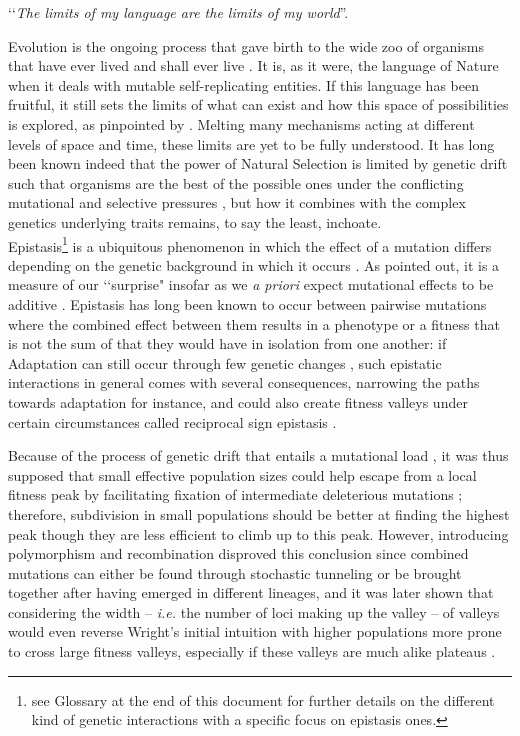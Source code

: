 \documentclass[11pt,onecolumn]{article}
\begin{document}
‘‘\textit{The limits of my language are the limits of my world}''.

\citep{Wittgenstein22}

Evolution is the ongoing process that gave birth to the wide zoo of organisms that have ever lived and shall ever live \citep{Darwin59,Wallace58}. It is, as it were, the language of Nature when it deals with mutable self-replicating entities. If this language has been fruitful, it still sets the limits of what can exist and how this space of possibilities is explored, as pinpointed by \citet{Wittgenstein22}. Melting many mechanisms acting at different levels of space and time, these limits are yet to be fully understood. It has long been known indeed that the power of Natural Selection is limited by genetic drift \citep{Wright30} such that organisms are the best of the possible ones under the conflicting mutational and selective pressures \citep{Kimura62,Ohta92}, but how it combines with the complex genetics underlying traits remains, to say the least, inchoate.\\

Epistasis\footnote{see Glossary at the end of this document for further details on the different kind of genetic interactions with a specific focus on epistasis ones.} is a ubiquitous phenomenon in which the effect of a mutation differs depending on the genetic background in which it occurs \citep{Bateson09,Phillips08}. As \citet{Weinreich13} pointed out, it is a measure of our ‘‘surprise" insofar as we \textit{a priori} expect mutational effects to be additive \citep{Phillips08}. Epistasis has long been known to occur between pairwise mutations where the combined effect between them results in a phenotype or a fitness that is not the sum of that they would have in isolation from one another: if Adaptation can still occur through few genetic changes \citep{Orr05}, such epistatic interactions in general comes with several consequences, narrowing the paths towards adaptation \citep{Poelwijk07} for instance, and could also create fitness valleys under certain circumstances called reciprocal sign epistasis \citep{Weinreich05b,Poelwijk11}.

Because of the process of genetic drift \citep{Wright30,Kimura58,Ohta92} that entails a mutational load \citep{Haldane37,Muller50,Agrawal12}, it was thus supposed that small effective population sizes could help escape from a local fitness peak by facilitating fixation of intermediate deleterious mutations \citep{Wright30,Wright32}; therefore, subdivision in small populations should be better at finding the highest peak though they are less efficient to climb up to this peak. However, introducing polymorphism and recombination disproved this conclusion \citep{Weinreich05} since combined mutations can either be found through stochastic tunneling \citep{Iwasa04b} or be brought together after having emerged in different lineages, and it was later shown that considering the width -- \textit{i.e.} the number of loci making up the valley -- of valleys would even reverse Wright's initial intuition with higher populations more prone to cross large fitness valleys, especially if these valleys are much alike plateaus \citep{Weissman09}.
\end{document}
